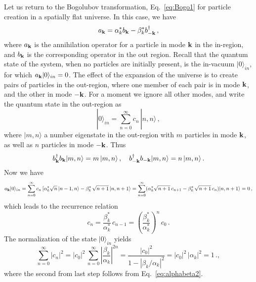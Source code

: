 \documentclass[eqsecnum,floats,aps,prd,floatfix,titlepage,tightenlines]{revtex4}
\begin{document}
Let us return to the Bogolubov transformation, Eq.~\eqref{eq:Bogo1} for particle creation in a spatially flat universe. In
this case, we have 
\begin{equation}
a_{\bf k}= \alpha _{k}^* b_{\bf k}     - \beta _{k}^*  b_{\bf -k}^\dagger \,,
                                      \label{eq:Bogo-flat}
\end{equation}
where $a_{\bf k}$ is the annihilation operator for a particle in mode ${\bf k}$   in the in-region, and $b_{\bf k}$ is the
corresponding operator in the out region. Recall that the quantum state of the system, when no particles are initially
present, is the in-vacuum $|0\rangle_{in}$, for which $a_{\bf k} |0\rangle_{in}=0$. The effect of the expansion of the universe
is to create pairs of particles in the out-region, where one member of each pair is in mode ${\bf k}$, and the other in
mode ${\bf - k}$. For a moment we ignore all other modes, and write the quantum state in the out-region as
 \begin{equation}
 |0\rangle_{in}= \sum_{n=0}^\infty c_n\, |n,n \rangle \, ,
 \end{equation}
where  $|m,n\rangle$  a number eigenstate in the out-region with $m$ particles in mode ${\bf k}$, as well as $n$ particles in mode ${\bf -k}$.
Thus
\begin{equation}
  b_{\bf k}^\dagger b_{\bf k} |m,n\rangle =   m\,   |m,n\rangle \,,  \quad b_{\bf -k}^\dagger b_{\bf -k} |m,n\rangle  = n \,  |m,n\rangle \,.
 \end{equation}
Now we have
 \begin{equation}
 a_{\bf k}|0\rangle_{in}=  \sum_{n=0}^\infty    c_n \,[  \alpha _{k}^* \sqrt{n}\,  |n-1,n \rangle -  \beta _{k}^*\, \sqrt{n+1}\, |n,n+1 \rangle 
 = \sum_{n=0}^\infty   ( \alpha _{k}^* \sqrt{n+1}\, c_{n+1} - \beta _{k}^*\, \sqrt{n+1}\, c_n)  |n,n+1 \rangle  = 0\, ,
 \end{equation}
which leads to the recurrence relation
 \begin{equation}
 c_{n} = \frac{\beta _{k}^*}{\alpha _{k}^*} \, c_{n-1} = \left(\frac{\beta _{k}^*}{\alpha _{k}^*}  \right)^n \, c_0 \,.
 \end{equation}
The normalization of the state $ |0\rangle_{in}$ yields
\begin{equation}
 \sum_{n=0}^\infty |c_n|^2 = |c_0|^2 \,  \sum_{n=0}^\infty \left|  \frac{\beta _{k}}{\alpha _{k}} \right|^{2n} = \frac{ |c_0|^2 }{1- |\beta _{k}/\alpha _{k}|^2} =  |c_0|^2 \,|\alpha _{k}|^2  =1  \,.,
  \end{equation}
where the second from last step follows from Eq.~\eqref{eq:alphabeta2}. 
\end{document}
